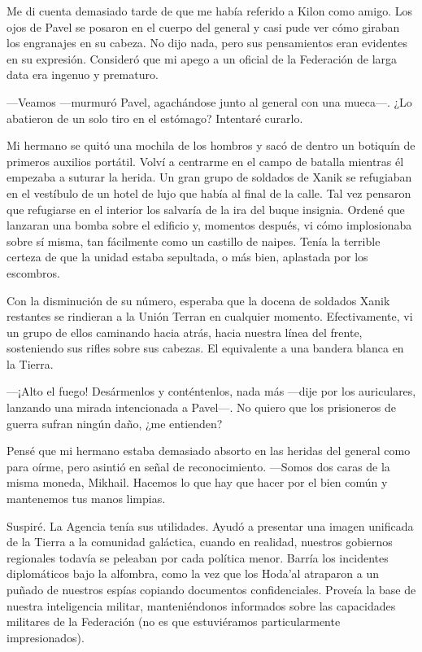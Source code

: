 Me di cuenta demasiado tarde de que me había referido a Kilon como amigo. Los ojos de Pavel se posaron en el cuerpo del general y casi pude ver cómo giraban los engranajes en su cabeza. No dijo nada, pero sus pensamientos eran evidentes en su expresión. Consideró que mi apego a un oficial de la Federación de larga data era ingenuo y prematuro.

—Veamos —murmuró Pavel, agachándose junto al general con una mueca—. ¿Lo abatieron de un solo tiro en el estómago? Intentaré curarlo.

Mi hermano se quitó una mochila de los hombros y sacó de dentro un botiquín de primeros auxilios portátil. Volví a centrarme en el campo de batalla mientras él empezaba a suturar la herida. Un gran grupo de soldados de Xanik se refugiaban en el vestíbulo de un hotel de lujo que había al final de la calle. Tal vez pensaron que refugiarse en el interior los salvaría de la ira del buque insignia. Ordené que lanzaran una bomba sobre el edificio y, momentos después, vi cómo implosionaba sobre sí misma, tan fácilmente como un castillo de naipes. Tenía la terrible certeza de que la unidad estaba sepultada, o más bien, aplastada por los escombros.

Con la disminución de su número, esperaba que la docena de soldados Xanik restantes se rindieran a la Unión Terran en cualquier momento. Efectivamente, vi un grupo de ellos caminando hacia atrás, hacia nuestra línea del frente, sosteniendo sus rifles sobre sus cabezas. El equivalente a una bandera blanca en la Tierra.

—¡Alto el fuego! Desármenlos y conténtenlos, nada más —dije por los auriculares, lanzando una mirada intencionada a Pavel—. No quiero que los prisioneros de guerra sufran ningún daño, ¿me entienden?

Pensé que mi hermano estaba demasiado absorto en las heridas del general como para oírme, pero asintió en señal de reconocimiento. —Somos dos caras de la misma moneda, Mikhail. Hacemos lo que hay que hacer por el bien común y mantenemos tus manos limpias.

Suspiré. La Agencia tenía sus utilidades. Ayudó a presentar una imagen unificada de la Tierra a la comunidad galáctica, cuando en realidad, nuestros gobiernos regionales todavía se peleaban por cada política menor. Barría los incidentes diplomáticos bajo la alfombra, como la vez que los Hoda'al atraparon a un puñado de nuestros espías copiando documentos confidenciales. Proveía la base de nuestra inteligencia militar, manteniéndonos informados sobre las capacidades militares de la Federación (no es que estuviéramos particularmente impresionados).

